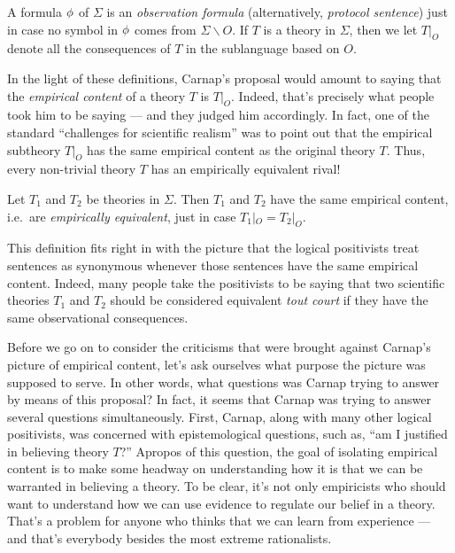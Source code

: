 \begin{defn} A formula $\phi$ of $\Sigma$ is an \emph{observation
    formula} (alternatively, \emph{protocol sentence}) just in case no
  symbol in $\phi$ comes from $\Sigma \backslash O$.  If $T$ is a
  theory in $\Sigma$, then we let $T|_O$ denote all the consequences
  of $T$ in the sublanguage based on $O$.  \end{defn}

In the light of these definitions, Carnap's proposal would amount to
saying that the \emph{empirical content} of a theory $T$ is $T|_O$.
Indeed, that's precisely what people took him to be saying --- and
they judged him accordingly.  In fact, one of the standard
``challenges for scientific realism'' was to point out that the
empirical subtheory $T|_O$ has the same empirical content as the
original theory $T$.  Thus, every non-trivial theory $T$ has an
empirically equivalent rival!  

\begin{defn} Let $T_1$ and $T_2$ be theories in $\Sigma$.  Then $T_1$
  and $T_2$ have the same empirical content, i.e.\ are
  \emph{empirically equivalent}, just in case
  $T_1|_O=T_2|_O$.  \end{defn}

This definition fits right in with the picture that the logical
positivists treat sentences as synonymous whenever those sentences
have the same empirical content.  Indeed, many people take the
positivists to be saying that two scientific theories $T_1$ and $T_2$
should be considered equivalent {\it tout court} if they have the same
observational consequences.

Before we go on to consider the criticisms that were brought against
Carnap's picture of empirical content, let's ask ourselves what
purpose the picture was supposed to serve.  In other words, what
questions was Carnap trying to answer by means of this proposal?  In
fact, it seems that Carnap was trying to answer several questions
simultaneously.  First, Carnap, along with many other logical
positivists, was concerned with epistemological questions, such as,
``am I justified in believing theory $T$?''  Apropos of this question,
the goal of isolating empirical content is to make some headway on
understanding how it is that we can be warranted in believing a
theory.  To be clear, it's not only empiricists who should want to
understand how we can use evidence to regulate our belief in a theory.
That's a problem for anyone who thinks that we can learn from
experience --- and that's everybody besides the most extreme
rationalists.

